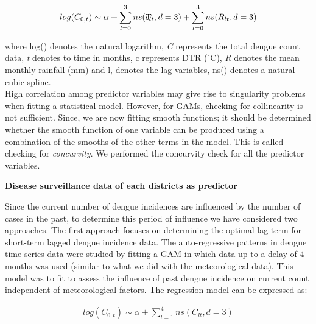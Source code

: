 \documentclass{bmcart}
\begin{document}
\begin{equation}
\begin{aligned}
\label{eq:meteorological}
log (C_{0,t}) \sim \alpha +  \sum_{l=0}^{3} ns(\rlap{T}c _ {lt}, d =3) + \sum_{l=0}^{3} ns(R_ {lt}, d =3)
\end{aligned}
\end{equation}


where log() denotes the natural logarithm, \textit{C} represents the total dengue count data, \textit{t} denotes to time in months, c represents DTR ($^{\circ}$C), \textit{R} denotes the mean monthly rainfall (mm) and  l, denotes the lag variables, ns() denotes a natural cubic spline. \\

High correlation among predictor variables may give rise to singularity problems when fitting a statistical model. However, for GAMs, checking for collinearity is not sufficient. Since, we are now fitting smooth functions; it should be determined whether the smooth function of one variable can be produced using a combination of the smooths of the other terms in the model. This is called checking for \textit{concurvity}. We performed the concurvity check for all the predictor variables.

\textbf{Disease surveillance data of each districts as predictor}

Since the current number of dengue incidences are influenced by the number of cases in the past, to determine this period of influence we have considered two approaches. The first approach focuses on determining the optimal lag term for short-term lagged dengue incidence data. The auto-regressive patterns in dengue time series data were studied by fitting a GAM in which data up to a delay of 4 months was used (similar to what we did with the meteorological data). This model was to fit to assess the influence of past dengue incidence on current count independent of meteorological factors. The regression model can be expressed as:

\begin{equation}
\begin{aligned}
\label{eq:short}
log (C_{0,t}) \sim \alpha + \sum_{l=1}^{4} ns(C_ {lt}, d =3) 
\end{aligned}
\end{equation}
\end{document}
